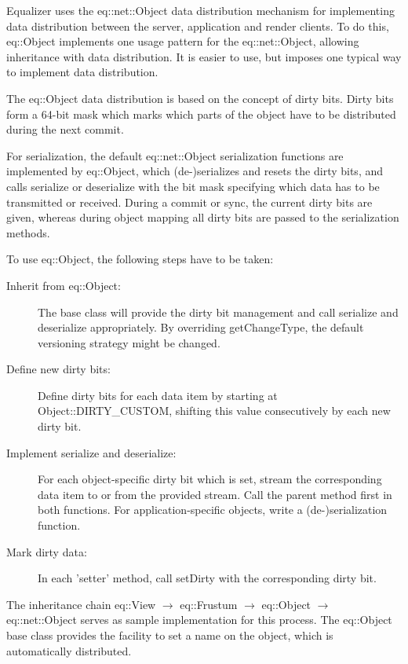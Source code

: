 \documentclass[10pt,a4]{scrartcl}
\begin{document}
Equalizer uses the \textsf{eq::net::Object} data distribution mechanism
for implementing data distribution between the server, application and
render clients. To do this, \textsf{eq::Object} implements one usage
pattern for the \textsf{eq::net::Object}, allowing inheritance with data
distribution. It is easier to use, but imposes one typical way to implement data
distribution.

The \textsf{eq::Object} data distribution is based on the concept of
dirty bits. Dirty bits form a 64-bit mask which marks which parts of the
object have to be distributed during the next commit.

For serialization, the default \textsf{eq::net::Object} serialization
functions are implemented by \textsf{eq::Object}, which (de-)serializes
and resets the dirty bits, and calls \textsf{serialize} or
\textsf{deserialize} with the bit mask specifying which data has to be
transmitted or received. During a commit or sync, the current dirty bits
are given, whereas during object mapping all dirty bits are passed to
the serialization methods.

To use \textsf{eq::Object}, the following steps have to be taken:

\begin{description}
\item[Inherit from \textsf{eq::Object}:] The base class will provide the
  dirty bit management and call serialize and deserialize
  appropriately. By overriding \textsf{getChangeType}, the default
  versioning strategy might be changed.
\item[Define new dirty bits:] Define dirty bits for each data item by
  starting at \textsf{Object::DIRTY\_CUSTOM}, shifting this value
  consecutively by each new dirty bit.
\item[Implement serialize and deserialize:] For each object-specific
  dirty bit which is set, stream the corresponding data item to or from
  the provided stream. Call the parent method first in both
  functions. For application-specific objects, write a (de-)serialization
  function.
\item[Mark dirty data:] In each 'setter' method, call \textsf{setDirty}
  with the corresponding dirty bit.
\end{description}

The inheritance chain \textsf{eq::View} $\rightarrow$
\textsf{eq::Frustum} $\rightarrow$ \textsf{eq::Object} $\rightarrow$
\textsf{eq::net::Object} serves as sample implementation for this
process. The \textsf{eq::Object} base class provides the facility to set
a name on the object, which is automatically distributed.
\end{document}
